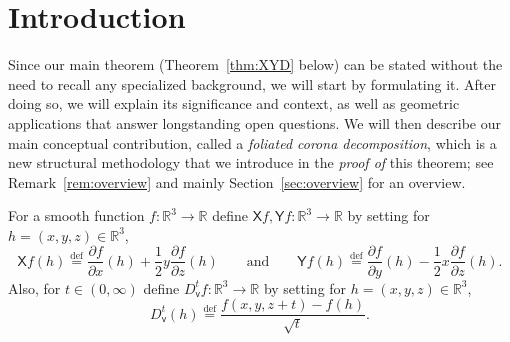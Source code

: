 \documentclass[11pt,reqno]{amsart}
\newcommand{\R}{\mathbb{R}}
\newcommand{\vv}{\mathsf{v}}
\newcommand{\XX}{\mathsf{X}}
\newcommand{\YY}{\mathsf{Y}}
\newcommand{\0}{\mathbf{0}}
\renewcommand{\1}{\mathbf 1}
\newcommand{\from}{\colon}
\newcommand{\eqdef}{\stackrel{\mathrm{def}}{=}}
\theoremstyle{remark}
\begin{document}
\maketitle
\setcounter{tocdepth}{4}
\tableofcontents









\section{Introduction}\label{sec:intro}

Since our main theorem (Theorem~\ref{thm:XYD} below) can be stated without the need to recall any specialized background, we will start by formulating it. After doing so, we will explain its significance and context, as well as geometric applications that answer longstanding open questions. We will then describe our  main conceptual contribution, called a {\em foliated corona decomposition}, which is a new structural methodology that we introduce in the {\em proof of} this theorem; see Remark~\ref{rem:overview} and mainly Section~\ref{sec:overview}  for an overview.

For a smooth function $f\from\R^3\to \R$ define $\XX f,\YY f\from\R^3\to \R$ by setting for $h=(x,y,z)\in \R^3$,
\begin{equation}\label{eq:def XY}
 \XX f(h)\eqdef \frac{\partial f}{\partial x}(h)+\frac{1}{2}y\frac{\partial f}{\partial z}(h)\qquad\mathrm{and}\qquad  \YY f(h)\eqdef \frac{\partial f}{\partial y}(h)-\frac{1}{2}x\frac{\partial f}{\partial z}(h).
\end{equation}
Also,  for $t\in (0,\infty)$ define $D_\vv^tf\from\R^3\to \R$ by setting for $h=(x,y,z)\in \R^3$,
\begin{equation}\label{eq:def Dv}
{D}_{\vv}^t(h)\eqdef \frac{f(x,y,z+t)-f(h)}{\sqrt{t}}.
\end{equation}
\end{document}
